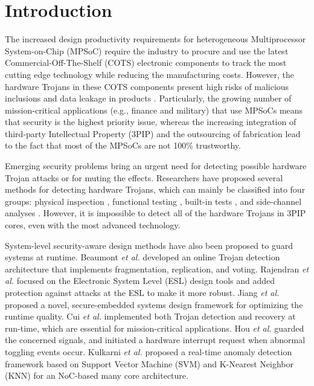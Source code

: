 \documentclass[10pt,journal]{IEEEtran}
\begin{document}
%
\IEEEpeerreviewmaketitle



\section{Introduction}

The increased design productivity requirements for heterogeneous Multiprocessor System-on-Chip (MPSoC) require the industry to procure and use the latest Commercial-Off-The-Shelf (COTS) electronic components to track the most cutting edge technology while reducing the manufacturing costs. However, the hardware Trojans in these COTS components present high risks of malicious inclusions and data leakage in products \cite{conference:XW}. Particularly, the growing number of mission-critical applications (e.g., finance and military) that use MPSoCs means that security is the highest priority issue, whereas the increasing integration of third-party Intellectual Property (3PIP) and the outsourcing of fabrication lead to the fact that most of the MPSoCs are not 100\% trustworthy.

Emerging security problems bring an urgent need for detecting possible hardware Trojan attacks or for muting the effects. Researchers have proposed several methods for detecting hardware Trojans, which can mainly be classified into four groups: physical inspection \cite{network:SS}, functional testing \cite{conference:MM}, built-in tests \cite{conference:KX}, and side-channel analyses \cite{article:FK}. However, it is impossible to detect all of the hardware Trojans in 3PIP cores, even with the most advanced technology.

System-level security-aware design methods have also been proposed to guard systems at runtime. Beaumont \textit{et al.} \cite{conference:MB} developed an online Trojan detection architecture that implements fragmentation, replication, and voting. Rajendran \textit{et al.} \cite{article:JR} focused on the Electronic System Level (ESL) design tools and added protection against attacks at the ESL to make it more robust. Jiang \textit{et al.} \cite{conference:KJ} proposed a novel, secure-embedded systems design framework for optimizing the runtime quality. Cui \textit{et al.} \cite{conference:XC} implemented both Trojan detection and recovery at run-time, which are essential for mission-critical applications. Hou \textit{et al.} \cite{article:YH} guarded the concerned signals, and initiated a hardware interrupt request when abnormal toggling events occur. Kulkarni \textit{et al.} \cite{article:AK} proposed a real-time anomaly detection framework based on Support Vector Machine (SVM) and K-Nearest Neighbor (KNN) for an NoC-based many core architecture.
\end{document}
